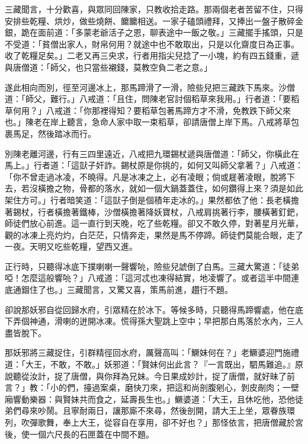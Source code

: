 三藏聞言，十分歡喜，與眾同回陳家，只教收拾走路。那兩個老者苦留不住，只得安排些乾糧、烘炒，做些燒餅、饝饝相送。一家子磕頭禮拜，又捧出一盤子散碎金銀，跪在面前道：「多蒙老爺活子之恩，聊表途中一飯之敬。」三藏擺手搖頭，只是不受道：「貧僧出家人，財帛何用？就途中也不敢取出，只是以化齋度日為正事。收了乾糧足矣。」二老又再三央求，行者用指尖兒捻了一小塊，約有四五錢重，遞與唐僧道：「師父，也只當些襯錢，莫教空負二老之意。」

遂此相向而別，徑至河邊冰上，那馬蹄滑了一滑，險些兒把三藏跌下馬來。沙僧道：「師父，難行。」八戒道：「且住，問陳老官討個稻草來我用。」行者道：「要稻草何用？」八戒道：「你那裡得知？要稻草包著馬蹄方才不滑，免教跌下師父來也。」陳老在岸上聽言，急命人家中取一束稻草，卻請唐僧上岸下馬。八戒將草包裹馬足，然後踏冰而行。

別陳老離河邊，行有三四里遠近，八戒把九環錫杖遞與唐僧道：「師父，你橫此在馬上。」行者道：「這獃子奸詐。錫杖原是你挑的，如何又叫師父拿著？」八戒道：「你不曾走過冰凌，不曉得。凡是冰凍之上，必有凌眼；倘或屣著凌眼，脫將下去，若沒橫擔之物，骨都的落水，就如一個大鍋蓋蓋住，如何鑽得上來？須是如此架住方可。」行者暗笑道：「這獃子倒是個積年走冰的。」果然都依了他：長老橫擔著錫杖，行者橫擔著鐵棒，沙僧橫擔著降妖寶杖，八戒肩挑著行李，腰橫著釘鈀，師徒們放心前進。這一直行到天晚，吃了些乾糧。卻又不敢久停，對著星月光華，觀的冰凍上亮灼灼，白茫茫，只情奔走，果然是馬不停蹄。師徒們莫能合眼，走了一夜。天明又吃些乾糧，望西又進。

正行時，只聽得冰底下撲喇喇一聲響喨，險些兒諕倒了白馬。三藏大驚道：「徒弟啞！怎麼這般響喨？」八戒道：「這河忒也凍得結實，地凌響了。或者這半中間連底通錮住了也。」三藏聞言，又驚又喜，策馬前進，趲行不題。

卻說那妖邪自從回歸水府，引眾精在於冰下。等候多時，只聽得馬蹄響處，他在底下弄個神通，滑喇的迸開冰凍。慌得孫大聖跳上空中；早把那白馬落於水內，三人盡皆脫下。

那妖邪將三藏捉住，引群精徑回水府，厲聲高叫：「鱖妹何在？」老鱖婆迎門施禮道：「大王，不敢，不敢。」妖邪道：「賢妹何出此言？『一言既出，駟馬難追。』原說聽從汝計，捉了唐僧，與你拜為兄妹。今日果成妙計，捉了唐僧，就好昧了前言？」教：「小的們，擡過案桌，磨快刀來，把這和尚剖腹剜心，剝皮剮肉；一壁廂響動樂器：與賢妹共而食之，延壽長生也。」鱖婆道：「大王，且休吃他，恐他徒弟們尋來吵鬧。且寧耐兩日，讓那廝不來尋，然後剖開，請大王上坐，眾眷族環列，吹彈歌舞，奉上大王，從容自在享用，卻不好也？」那怪依言，把唐僧藏於宮後，使一個六尺長的石匣蓋在中間不題。

